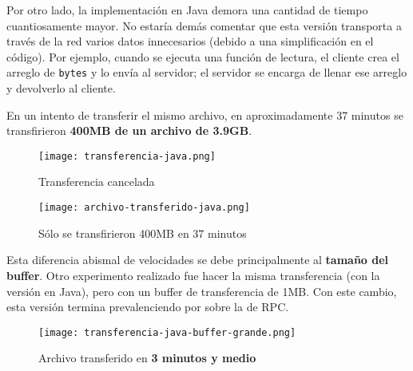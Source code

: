 Por otro lado, la implementación en Java demora una cantidad de tiempo cuantiosamente mayor. No estaría demás comentar que esta versión transporta a través de la red varios datos innecesarios (debido a una simplificación en el código). Por ejemplo, cuando se ejecuta una función de lectura, el cliente crea el arreglo de \texttt{bytes} y lo envía al servidor; el servidor se encarga de llenar ese arreglo y devolverlo al cliente. 

En un intento de transferir el mismo archivo, en aproximadamente 37 minutos se transfirieron \textbf{400MB de un archivo de 3.9GB}.

\begin{figure}[h]
    \centering
    \texttt{[image: transferencia-java.png]}
    \caption{Transferencia cancelada}
\end{figure}
\begin{figure}[h]
    \centering
    \texttt{[image: archivo-transferido-java.png]}
    \caption{Sólo se transfirieron 400MB en 37 minutos}
\end{figure}

Esta diferencia abismal de velocidades se debe principalmente al \textbf{tamaño del buffer}. Otro experimento realizado fue hacer la misma transferencia (con la versión en Java), pero con un buffer de transferencia de 1MB. Con este cambio, esta versión termina prevalenciendo por sobre la de RPC.

\begin{figure}[H]
    \centering
    \texttt{[image: transferencia-java-buffer-grande.png]}
    \caption{Archivo transferido en \textbf{3 minutos y medio} }
\end{figure}







\clearpage
\printbibliography



